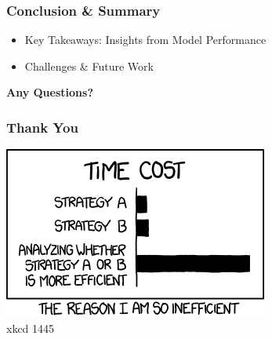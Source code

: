 \begin{frame}
    \frametitle{Conclusion \& Summary}
    \begin{itemize}
        \item Key Takeaways: Insights from Model Performance
        \item Challenges \& Future Work
    \end{itemize}
    \pause
    \centering
    \textbf{Any Questions?}
\end{frame}



\begin{frame}
	\frametitle{Thank You}
	\vspace{1cm}
	\centering
	\includegraphics{efficiency} \\
	xkcd 1445
\end{frame}






